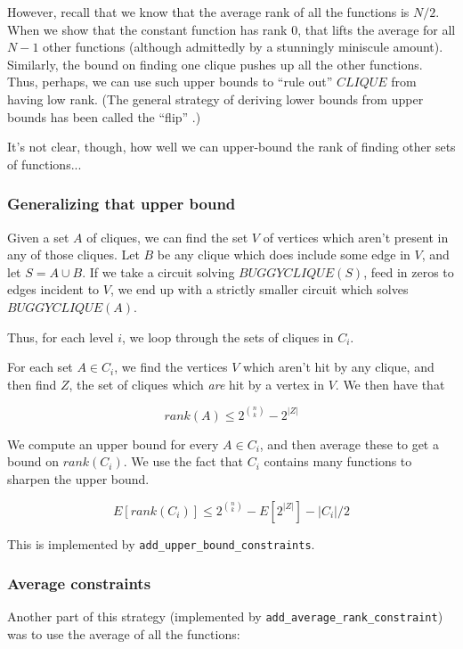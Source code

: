 \documentclass[12pt]{article}
\theoremstyle{definition}
\begin{document}
However, recall that we know that the average rank of all the functions
is $N/2$.
When we show that the constant function has rank 0, that lifts
the average for all $N-1$ other functions (although admittedly
by a stunningly miniscule amount).
Similarly, the bound on finding one clique pushes up all the other functions.
Thus, perhaps, we can use such upper bounds to ``rule out'' $CLIQUE$ from
having low rank. (The general strategy of deriving lower bounds from
upper bounds has been called the ``flip'' \cite{aaronson_pnp}.)

It's not clear, though, how well we can upper-bound the rank
of finding other sets of functions...

\subsubsection{Generalizing that upper bound}

Given a set $A$ of cliques, we
can find the set $V$ of vertices which aren't present in any of those cliques.
Let $B$ be any clique which does include some edge in $V$, and let
$S = A \cup B$. If we take a circuit solving $BUGGYCLIQUE(S)$,
feed in zeros to edges incident to $V$, we end up with a strictly smaller circuit 
which solves $BUGGYCLIQUE(A)$.

Thus, for each level $i$, we loop through the sets of cliques in $C_i$.

For each set $A \in C_i$, we find the vertices
$V$ which aren't hit by any clique, and then
find $Z$, the set of cliques which {\em are} hit by a vertex in $V$.
We then have that 

\[
rank(A) \le 2^{n \choose k} - 2^{|Z|}
\]

We compute an upper bound for every $A \in C_i$, and then average these
to get a bound on $rank(C_i)$.
 We use the fact that $C_i$ contains many
functions to sharpen the upper bound.

\[
E[rank(C_i)] \le 2^{n \choose k} - E[2^{|Z|}] - |C_i|/2
\]

This is implemented by {\tt add\_upper\_bound\_constraints}.

\subsubsection{Average constraints}

Another part of this strategy 
(implemented by {\tt add\_average\_rank\_constraint}) was
to use the average of all the functions:
\end{document}

